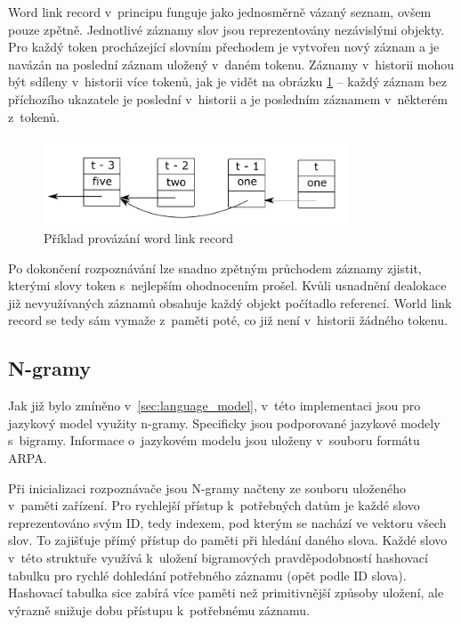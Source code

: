 Word link record v~principu funguje jako jednosměrně vázaný seznam, ovšem pouze zpětně. Jednotlivé záznamy slov jsou reprezentovány nezávislými objekty. Pro každý token procházející slovním přechodem je vytvořen nový záznam a je navázán na poslední záznam uložený v~daném tokenu. Záznamy v~historii mohou být sdíleny v~historii více tokenů, jak je vidět na obrázku \ref{fig:word_link_record} -- každý záznam bez příchozího ukazatele je poslední v~historii a je posledním záznamem v~některém z~tokenů. 

\begin{figure}[H]\label{fig:word_link_record}
	\centering
		\includegraphics[height=2.6cm]{obrazky-figures/word_link_record.pdf}
        \caption{Příklad provázání word link record}
\end{figure}

Po dokončení rozpoznávání lze snadno zpětným průchodem záznamy zjistit, kterými slovy token s~nejlepším ohodnocením prošel. Kvůli usnadnění dealokace již nevyužívaných záznamů obsahuje každý objekt počítadlo referencí. World link record se tedy sám vymaže z~paměti poté, co již není v~historii žádného tokenu.

\subsection{N-gramy} \label{sec:n_grams}
Jak již bylo zmíněno v~\ref{sec:language_model}, v~této implementaci jsou pro jazykový model využity n-gramy. Specificky jsou podporované jazykové modely s~bigramy. Informace o~jazykovém modelu jsou uloženy v~souboru formátu ARPA.

Při inicializaci rozpoznávače jsou N-gramy načteny ze souboru uloženého v~paměti zařízení. Pro rychlejší přístup k~potřebných datům je každé slovo reprezentováno svým ID, tedy indexem, pod kterým se nachází ve vektoru všech slov. To zajišťuje přímý přístup do paměti při hledání daného slova. Každé slovo v~této struktuře využívá k~uložení bigramových pravděpodobností hashovací tabulku pro rychlé dohledání potřebného záznamu (opět podle ID slova). Hashovací tabulka sice zabírá více paměti než primitivnější způsoby uložení, ale výrazně snižuje dobu přístupu k~potřebnému záznamu. 

